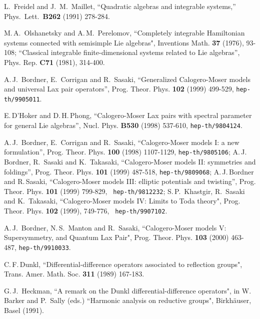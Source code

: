 \documentclass[a4paper,12pt]{article}
\begin{document}
\begin{thebibliography}{99}
L.~Freidel and J.~M.~Maillet,
``Quadratic algebras and integrable systems,''
Phys.\ Lett.\ {\bf B262} (1991) 278-284.


 M.\,A.\, Olshanetsky and A.\,M.\, Perelomov,
``Completely integrable Hamiltonian systems connected with
 semisimple Lie algebras",
 Inventions Math. {\bf 37} (1976), 93-108;
 ``Classical integrable finite-dimensional systems related to Lie
 algebras'',
 Phys. Rep.  {\bf C71} (1981), 314-400.

   A.\,J.\, Bordner, E.\, Corrigan and R.\, Sasaki,
``Generalized Calogero-Moser models and  universal Lax pair operators'',
 Prog. Theor. Phys. {\bf 102}  (1999)  499-529,
 {\tt  hep-th/9905011}.

E.\,D'Hoker and D.\,H.\,Phong, ``Calogero-Moser
Lax pairs with spectral parameter for general Lie algebras'',
Nucl. Phys. {\bf B530} (1998) 537-610, {\tt hep-th/9804124}.




 A.\,J.\, Bordner, E.\, Corrigan and R.\, Sasaki,
``Calogero-Moser models I: a new formulation'',
Prog. Theor. Phys. {\bf 100} (1998) 1107-1129, {\tt hep-th/9805106};
A.\,J.\, Bordner,   R.\,
Sasaki and K.\, Takasaki, ``Calogero-Moser models II:
symmetries and foldings'', Prog. Theor. Phys. {\bf
101} (1999) 487-518, {\tt hep-th/9809068};
A.\,J.\,Bordner and R.\,Sasaki, ``Calogero-Moser models III: elliptic
potentials and
twisting'', Prog. Theor. Phys. {\bf 101} (1999) 799-829, {\tt
hep-th/9812232};
S.\,P.\, Khastgir, R.\, Sasaki and K.\, Takasaki,
``Calogero-Moser models IV: Limits to Toda theory",
 Prog. Theor. Phys. {\bf 102}  (1999), 749-776, {\tt
hep-th/9907102}.


  A.\,J.\, Bordner, N.\,S.\, Manton and R.\, Sasaki,
``Calogero-Moser models V:  Supersymmetry,
and Quantum Lax Pair", Prog. Theor. Phys. {\bf 103} (2000) 463-487,
{\tt hep-th/9910033}.

C.\,F.\,Dunkl, ``Differential-difference operators associated to
reflection groups", Trans. Amer. Math. Soc. {\bf 311} (1989) 167-183.

G.\,J.\, Heckman, ``A remark on the Dunkl differential-difference
operators", in W.\, Barker and P.\, Sally (eds.) ``Harmonic analysis
on reductive groups", Birkh\"auser, Basel (1991).


\end{thebibliography}
\end{document}

